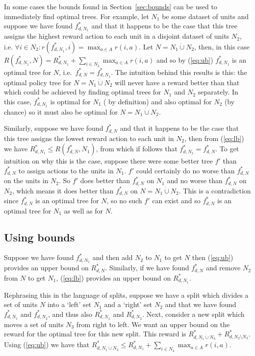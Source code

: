 \documentclass{article}
\begin{document}
In some cases the bounds found in Section~\ref{sec:bounds} can be used
to immediately find optimal trees. For example, let $N_1$ be some
dataset of units and suppose we have found $f^{*}_{d,N_{1}}$ and that
it happens to be the case that this tree assigns the highest reward
action to each unit in a disjoint dataset of units $N_2$, i.e.
$\forall i \in N_{2} : r(f^{*}_{d,N_{1}},i) = \max_{a \in A}
r(i,a)$. Let $N = N_{1} \dot\cup N_{2}$, then, in this case
$R(f^{*}_{d,N_{1}},N) = R^{*}_{d,N_{1}} + \sum_{i \in N_{2}} \max_{a
  \in A} r(i,a)$ and so by (\ref{eq:ub}) $f^{*}_{d,N_{1}}$ is an
optimal tree for $N$, i.e.\ $f^{*}_{d,N} = f^{*}_{d,N_{1}}$. The
intuition behind this results is this: the optimal policy tree for
$N = N_{1} \dot\cup N_{2}$ will never have a reward better than that
which could be achieved by finding optimal trees for $N_1$ and $N_2$
separately. In this case, $f^{*}_{d,N_{1}}$ is optimal for $N_1$ ( by
definition) and also optimal for $N_2$ (by chance) so it must also be
optimal for $N = N_{1} \dot\cup N_{2}$.

Similarly, suppose we have found $f^{*}_{d,N}$ and that it happens to
be the case that this tree assigns the lowest reward action to each
unit in $N_2$, then from (\ref{eq:lb}) we have
$R^{*}_{d,N_{1}} \leq R(f^{*}_{d,N},N_{1})$, from which if follows
that $f^{*}_{d,N_{1}} = f^{*}_{d,N}$. To get intuition on why this is
the case, suppose there were some better tree $f'$ than $f^{*}_{d,N}$
to assign actions to the units in $N_1$. $f'$ could certainly do no
worse than $f^{*}_{d,N}$ on the units in $N_2$. So $f'$ does better
than $f^{*}_{d,N}$ on $N_1$ and no worse than $f^{*}_{d,N}$ on $N_2$,
which means it does better than $f^{*}_{d,N}$ on $N = N_{1} \dot\cup
N_{2}$. This is a contradiction since $f^{*}_{d,N}$ is an optimal tree
for $N$, so no such $f'$ can exist and so $f^{*}_{d,N}$ is an optimal
tree for $N_1$ as well as for $N$.


\subsection{Using bounds}
\label{sec:usingbounds}



Suppose we have found $f^{*}_{d,N_{1}}$
and then add $N_2$ to $N_{1}$ to get $N$ then (\ref{eq:ub}) provides
an upper bound on $R^{*}_{d,N}$. Similarly, if we have found
$f^{*}_{d,N}$ and remove $N_2$ from $N$ to get $N_1$, (\ref{eq:lb})
provides an upper bound on $R^{*}_{d,N_{1}}$.

Rephrasing this in the language of splits, suppose we have a split
which divides a set of units $N$ into a `left' set $N_{1}$ and a
`right' set $N_{2}$ and that we have found $f^{*}_{d,N_{1}}$ and
$f^{*}_{d,N_{2}}$, and thus also $R^{*}_{d,N_{1}}$ and
$R^{*}_{d,N_{2}}$. Next, consider a new split which moves a set of
units $N_3$ from right to left. We want an upper bound on the reward
for the optimal tree for this new split. This reward is
$R^{*}_{d,N_{1}\dot\cup N_{3}} +
R^{*}_{d,N_{2}\setminus N_{3}}$. Using
(\ref{eq:ub}) we have that $R^{*}_{d,N_{1}\dot\cup N_{3}} \leq
R^{*}_{d,N_{1}} + \sum_{i \in N_{3}} \max_{a \in A} r(i,a)$. 
\end{document}
